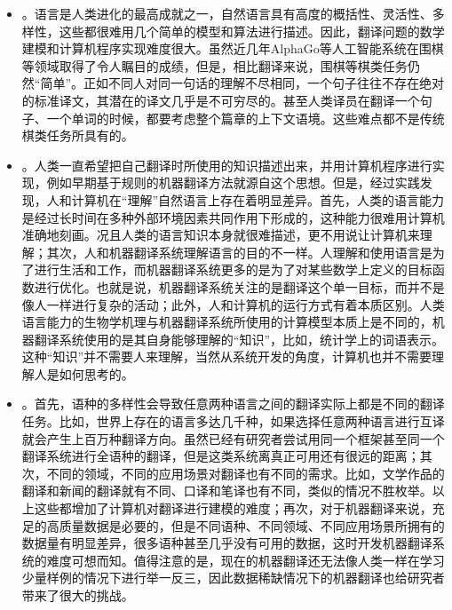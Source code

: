 \begin{itemize}
\vspace{0.5em}
\item {\small{}}。语言是人类进化的最高成就之一，自然语言具有高度的概括性、灵活性、多样性，这些都很难用几个简单的模型和算法进行描述。因此，翻译问题的数学建模和计算机程序实现难度很大。虽然近几年AlphaGo等人工智能系统在围棋等领域取得了令人瞩目的成绩，但是，相比翻译来说，围棋等棋类任务仍然“简单”。正如不同人对同一句话的理解不尽相同，一个句子往往不存在绝对的标准译文，其潜在的译文几乎是不可穷尽的。甚至人类译员在翻译一个句子、一个单词的时候，都要考虑整个篇章的上下文语境。这些难点都不是传统棋类任务所具有的。
\vspace{0.5em}
\item {\small{}}。人类一直希望把自己翻译时所使用的知识描述出来，并用计算机程序进行实现，例如早期基于规则的机器翻译方法就源自这个思想。但是，经过实践发现，人和计算机在“理解”自然语言上存在着明显差异。首先，人类的语言能力是经过长时间在多种外部环境因素共同作用下形成的，这种能力很难用计算机准确地刻画。况且人类的语言知识本身就很难描述，更不用说让计算机来理解；其次，人和机器翻译系统理解语言的目的不一样。人理解和使用语言是为了进行生活和工作，而机器翻译系统更多的是为了对某些数学上定义的目标函数进行优化。也就是说，机器翻译系统关注的是翻译这个单一目标，而并不是像人一样进行复杂的活动；此外，人和计算机的运行方式有着本质区别。人类语言能力的生物学机理与机器翻译系统所使用的计算模型本质上是不同的，机器翻译系统使用的是其自身能够理解的“知识”，比如，统计学上的词语表示。这种“知识”并不需要人来理解，当然从系统开发的角度，计算机也并不需要理解人是如何思考的。
\vspace{0.5em}
\item {\small{}}。首先，语种的多样性会导致任意两种语言之间的翻译实际上都是不同的翻译任务。比如，世界上存在的语言多达几千种，如果选择任意两种语言进行互译就会产生上百万种翻译方向。虽然已经有研究者尝试用同一个框架甚至同一个翻译系统进行全语种的翻译，但是这类系统离真正可用还有很远的距离；其次，不同的领域，不同的应用场景对翻译也有不同的需求。比如，文学作品的翻译和新闻的翻译就有不同、口译和笔译也有不同，类似的情况不胜枚举。以上这些都增加了计算机对翻译进行建模的难度；再次，对于机器翻译来说，充足的高质量数据是必要的，但是不同语种、不同领域、不同应用场景所拥有的数据量有明显差异，很多语种甚至几乎没有可用的数据，这时开发机器翻译系统的难度可想而知。值得注意的是，现在的机器翻译还无法像人类一样在学习少量样例的情况下进行举一反三，因此数据稀缺情况下的机器翻译也给研究者带来了很大的挑战。
\vspace{0.5em}
\end{itemize}

